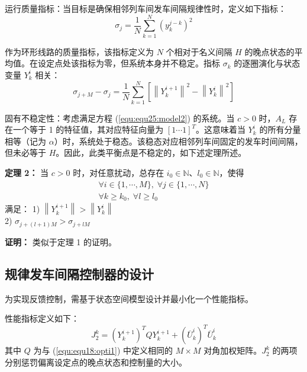 运行质量指标：当目标是确保相邻列车间发车间隔规律性时，定义如下指标：
\begin{equation}
	\sigma_{j}=\frac{1}{N} \sum_{k=1}^{N}\left(y_{k}^{j-k}\right)^{2}
\end{equation}

作为环形线路的质量指标，该指标定义为 $N$ 个相对于名义间隔 $H$ 的晚点状态的平均值。在设定点处该指标为零，但系统本身并不稳定。指标 $\sigma_k$ 的逐圈演化与状态变量 $Y_k^i$ 相关：
\begin{equation}
	\sigma_{j+M}-\sigma_{j}=\frac{1}{N} \sum_{k=1}^{N}\left[\left\|Y_{k}^{i+1}\right\|^{2}-\left\|Y_{k}^{i}\right\|^{2}\right]
\end{equation}

固有不稳定性：考虑满足方程 (\ref{equ:equ25:model2}) 的系统。当 $c>0$ 时，$A_L$ 存在一个等于 1 的特征值，其对应特征向量为 $[1 \cdots 1]^T$。这意味着当 $Y_k^i$ 的所有分量相等（记为 $\alpha$）时，系统处于稳态。该稳态对应相邻列车间固定的发车时间间隔，但未必等于 $H$。因此，此类平衡点是不稳定的，如下述定理所述。

\textbf{定理 2：} 当 $c>0$ 时，对任意扰动，总存在 $i_0 \in \mathbb{N}$、$l_0 \in \mathbb{N}$，使得
$$
\begin{gathered}
	\forall i \in \{1, \cdots, M\}, \; \forall j \in \{1, \cdots, N\} \\
	\forall k \geq k_{0}, \; \forall l \geq l_{0}
\end{gathered}
$$
满足：
1) $\left\|Y_{k}^{i+1}\right\|>\left\|Y_{k}^{i}\right\|$ \\
2) $\sigma_{j+(l+1) M}>\sigma_{j+l M}$

\textbf{证明：} 类似于定理 1 的证明。

\subsection{规律发车间隔控制器的设计}
\label{5.6}
为实现反馈控制，需基于状态空间模型设计并最小化一个性能指标。

性能指标定义如下：
\begin{equation}
	J_2^k=(Y_k^{i+1})^{T}QY_k^{i+1}+({\overline{U}}_k^i)^T{\overline{U}}_k^i
	\label{equ:equ33:opti2}
\end{equation}
其中 $Q$ 为与 (\ref{equ:equ18:opti1}) 中定义相同的 $M \times M$ 对角加权矩阵。$J_2^k$ 的两项分别惩罚偏离设定点的晚点状态和控制量的大小。

